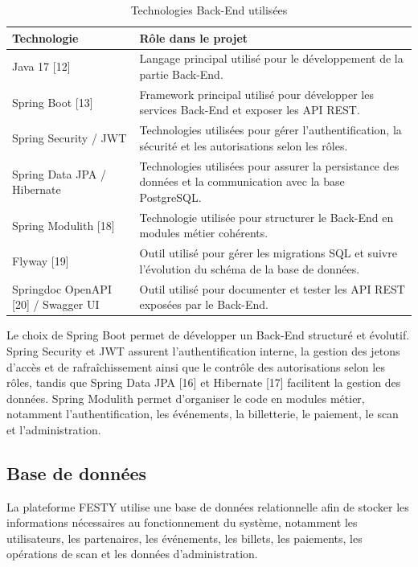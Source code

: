 \begin{table}[H]
\centering
\caption{Technologies Back-End utilisées}
\label{tableau:2-11}
\renewcommand{\arraystretch}{1.2}
\begin{tabularx}{\textwidth}{|>{\raggedright\arraybackslash}X|>{\raggedright\arraybackslash}X|}
\hline
\rowcolor[HTML]{ECF4FF}
\textbf{Technologie} & \textbf{Rôle dans le projet} \\
\hline
Java 17 [12] & Langage principal utilisé pour le développement de la partie Back-End. \\
\hline
Spring Boot [13] & Framework principal utilisé pour développer les services Back-End et exposer les API REST. \\
\hline
Spring Security / JWT & Technologies utilisées pour gérer l’authentification, la sécurité et les autorisations selon les rôles. \\
\hline
Spring Data JPA / Hibernate & Technologies utilisées pour assurer la persistance des données et la communication avec la base PostgreSQL. \\
\hline
Spring Modulith [18] & Technologie utilisée pour structurer le Back-End en modules métier cohérents. \\
\hline
Flyway [19] & Outil utilisé pour gérer les migrations SQL et suivre l’évolution du schéma de la base de données. \\
\hline
Springdoc OpenAPI [20] / Swagger UI & Outil utilisé pour documenter et tester les API REST exposées par le Back-End. \\
\hline
\end{tabularx}
\end{table}


Le choix de Spring Boot permet de développer un Back-End structuré et évolutif. Spring Security et JWT assurent l’authentification interne, la gestion des jetons d’accès et de rafraîchissement ainsi que le contrôle des autorisations selon les rôles, tandis que Spring Data JPA [16] et Hibernate [17] facilitent la gestion des données. Spring Modulith permet d’organiser le code en modules métier, notamment l’authentification, les événements, la billetterie, le paiement, le scan et l’administration.


\subsection{Base de données}


La plateforme FESTY utilise une base de données relationnelle afin de stocker les informations nécessaires au fonctionnement du système, notamment les utilisateurs, les partenaires, les événements, les billets, les paiements, les opérations de scan et les données d’administration.


